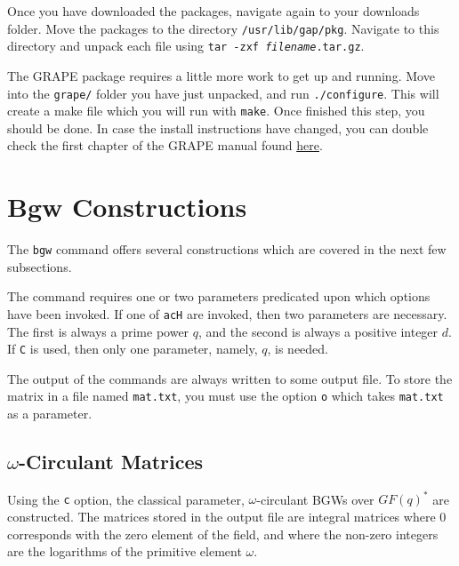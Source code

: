 \documentclass[a4paper,10pt]{article}
\begin{document}
Once you have downloaded the packages, navigate again to your downloads folder. Move the packages to the directory {\tt /usr/lib/gap/pkg}. Navigate to this directory and unpack each file using {\tt tar -zxf {\it filename}.tar.gz}. 

The GRAPE package requires a little more work to get up and running. Move into the {\tt grape/} folder you have just unpacked, and run {\tt ./configure}. This will create a make file which you will run with {\tt make}. Once finished this step, you should be done. In case the install instructions have changed, you can double check the first chapter of the GRAPE manual found \href{https://gap-packages.github.io/grape}{here}.

\section{\centering\sc Bgw Constructions}

The {\tt bgw} command offers several constructions which are covered in the next few subsections. 

The command requires one or two parameters predicated upon which options have been invoked. If one of {\tt acH} are invoked, then two parameters are necessary. The first is always a prime power $q$, and the second is always a positive integer $d$. If {\tt C} is used, then only one parameter, namely, $q$, is needed.

The output of the commands are always written to some output file. To store the matrix in a file named {\tt mat.txt}, you must use the option {\tt o} which takes {\tt mat.txt} as a parameter.

\subsection{\sc $\omega$-Circulant Matrices}
Using the {\tt c} option, the classical parameter, $\omega$-circulant BGWs over $GF(q)^*$ are constructed. The matrices stored in the output file are integral matrices where $0$ corresponds with the zero element of the field, and where the non-zero integers are the logarithms of the primitive element $\omega$.
\end{document}

